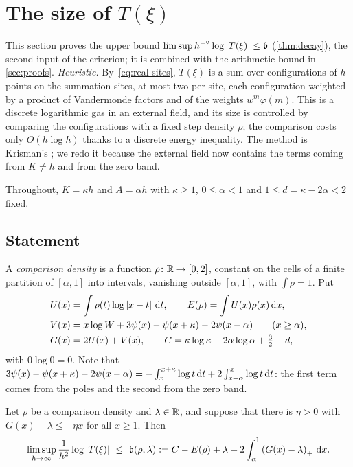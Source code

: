 \section{The size of \texorpdfstring{$T(\xi)$}{T(ξ)}}\label{sec:decay}

This section proves the upper bound $\limsup h^{-2}\log\left\lvert T(\xi)\right\rvert\le\mathfrak{b}$
(\cref{thm:decay}), the second input of the criterion; it is combined with the arithmetic bound in
\cref{sec:proofs}. \emph{Heuristic.} By~\eqref{eq:real-sites}, $T(\xi)$ is a sum over
configurations of $h$ points on the summation sites, at most two per site, each configuration
weighted by a product of Vandermonde factors and of the weights $w^m\varphi(m)$. This is a discrete
logarithmic gas in an external field, and its size is controlled by comparing the configurations
with a fixed step density $\rho$; the comparison costs only $O(h\log h)$ thanks to a discrete
energy inequality. The method is Krisman's \cite[\S6--7]{Krisman2026chi2}; we redo it because the
external field now contains the terms coming from $K\ne h$ and from the zero band.

Throughout, $K=\kappa h$ and $A=\alpha h$ with $\kappa\ge1$, $0\le\alpha<1$ and
$1\le d=\kappa-2\alpha<2$ fixed.

\subsection{Statement}\label{subsec:decay-statement}

A \emph{comparison density} is a function $\rho\colon\mathbb{R}\to[0,2]$, constant on the cells of a
finite partition of $[\alpha,1]$ into intervals, vanishing outside $[\alpha,1]$, with
$\int\rho=1$. Put
\begin{align*}
  U(x)&=\int\rho(t)\log\left\lvert x-t\right\rvert\,\mathrm{d} t,\qquad E(\rho)=\int U(x)\rho(x)\,\mathrm{d} x,\\
  V(x)&=x\log W+3\psi(x)-\psi(x+\kappa)-2\psi(x-\alpha)\qquad(x\ge\alpha),\\
  G(x)&=2U(x)+V(x),\qquad C=\kappa\log\kappa-2\alpha\log\alpha+\tfrac32-d,
\end{align*}
with $0\log0=0$. Note that $3\psi(x)-\psi(x+\kappa)-2\psi(x-\alpha)=-\int_x^{x+\kappa}\log t\,\mathrm{d}
t+2\int_{x-\alpha}^x\log t\,\mathrm{d} t$: the first term comes from the poles and the second from the
zero band.

\begin{theorem}\label{thm:decay}
Let $\rho$ be a comparison density and $\lambda\in\mathbb{R}$, and suppose that there is $\eta>0$ with
$G(x)-\lambda\le-\eta x$ for all $x\ge1$. Then
\[
  \limsup_{h\to\infty}\frac{1}{h^2}\log\abs{T(\xi)}\ \le\ \bconst(\rho,\lambda):=
  C-E(\rho)+\lambda+2\int_\alpha^1\pos{G(x)-\lambda}\diff x .
\]
\end{theorem}

